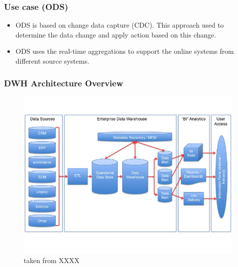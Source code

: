 \begin{frame}
\frametitle{Use case (ODS)}

	\begin{itemize}[<+->]
		\item ODS is based on change data capture (CDC). This approach used to determine the data change and apply action based on this change.
		\item ODS uses the real-time aggregations to support the online systems from different source systems.
	\end{itemize}
\end{frame}

\begin{frame}
	\frametitle{DWH Architecture Overview}
	\begin{figure}[ht]
		
		\centering
		\includegraphics[width=.9\linewidth,height=.8\textheight]{./Figures/chapter-01/Datawarehouse_reference_architecture.jpg}
			\caption{taken from XXXX}
	\end{figure}
\end{frame}

